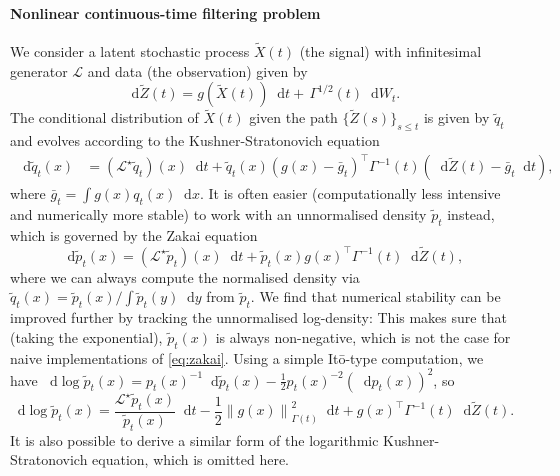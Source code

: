 \documentclass[10pt]{article}
\numberwithin{equation}{section}
\numberwithin{figure}{section}
\theoremstyle{remark}
\newcommand{\cL}{\mathcal L}
\newcommand{\dd }{\mathop{}\!\mathrm{d}}
\begin{document}
\paragraph{Nonlinear continuous-time filtering problem}
We consider a latent stochastic process $\tilde X(t)$ (the signal) with infinitesimal generator $\cL$ and data (the observation) given by 
\begin{equation}\label{eq:filtering_cts_guiding}
    \dd \tilde Z(t) = g(\tilde X(t))\dd t + \,\Gamma^{1/2}(t)\dd W_t.
\end{equation}
The conditional distribution of $\tilde X(t)$ given the path $\{\tilde Z(s)\}_{s\leq t}$ is given by $\tilde q_t$ and evolves according to the Kushner-Stratonovich equation
\begin{align*}
    \dd \tilde q_t(x) &= (\cL^\star \tilde q_t)(x)\dd t + \tilde q_t(x)\left(g(x) - \bar g_t \right)^\top \Gamma^{-1}(t)\left(\dd \tilde Z(t) -\bar g_t\dd t\right),
\end{align*}
where $\bar g_t = \int g(x)q_t(x)\dd x$. It is often easier (computationally less intensive and numerically more stable) to work with an unnormalised density $\tilde{p}_t$ instead, which is governed by the Zakai equation
\begin{equation}\label{eq:zakai}
    \dd \tilde p_t(x) = (\cL^\star \tilde p_t)(x)\dd t + \tilde p_t(x) g(x)^\top \Gamma^{-1}(t)\dd \tilde Z(t),
\end{equation}
where we can always compute the normalised density via $\tilde q_t(x) = \tilde p_t(x)/\int \tilde p_t(y)\dd y$ from $\tilde p_t$. We find that numerical stability can be improved further by tracking the unnormalised log-density: This makes sure that (taking the exponential), $\tilde p_t(x)$ is always non-negative, which is not the case for naive implementations of \eqref{eq:zakai}. Using a simple It\=o-type computation, we have $
    \dd \log \tilde p_t(x) = {p_t(x)}^{-1}{\dd\tilde p_t(x)} -\tfrac{1}{2}{p_t(x)}^{-2}{(\dd p_t(x))^2}$, so
\begin{equation}\label{eq:logzakai}
    \dd \log \tilde p_t(x) = \frac{\cL^\star  \tilde p_t(x)}{\tilde p_t(x)}\dd t - \frac{1}{2}\left\|g(x)\right\|_{\Gamma(t)}^2\dd t +g(x)^\top \Gamma^{-1}(t)\dd \tilde Z(t). 
\end{equation}
It is also possible to derive a similar form of the logarithmic Kushner-Stratonovich equation, which is omitted here. 
\end{document}
